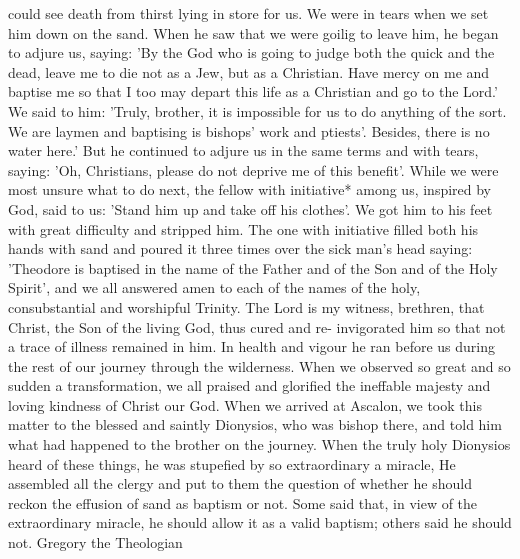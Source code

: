 could see death from thirst lying in store for us. We were in tears
when we set him down on the sand. When he saw that we were
goilig to leave him, he began to adjure us, saying: 'By the God who
is going to judge both the quick and the dead, leave me to die not
as a Jew, but as a Christian. Have mercy on me and baptise me so
that I too may depart this life as a Christian and go to the Lord.'
We said to him: 'Truly, brother, it is impossible for us to do
anything of the sort. We are laymen and baptising is bishops' work
and ptiests'. Besides, there is no water here.' But he continued to
adjure us in the same terms and with tears, saying: 'Oh, Christians,
please do not deprive me of this benefit'. While we were most
unsure what to do next, the fellow with initiative* among us,
inspired by God, said to us: 'Stand him up and take off his clothes'.
We got him to his feet with great difficulty and stripped him. The
one with initiative filled both his hands with sand and poured it
three times over the sick man's head saying: 'Theodore is baptised
in the name of the Father and of the Son and of the Holy Spirit',
and we all answered amen to each of the names of the holy,
consubstantial and worshipful Trinity. The Lord is my witness,
brethren, that Christ, the Son of the living God, thus cured and re-
invigorated him so that not a trace of illness remained in him. In
health and vigour he ran before us during the rest of our journey
through the wilderness. When we observed so great and so sudden
a transformation, we all praised and glorified the ineffable majesty
and loving kindness of Christ our God. When we arrived at
Ascalon, we took this matter to the blessed and saintly Dionysios,
who was bishop there, and told him what had happened to the
brother on the journey. When the truly holy Dionysios heard of
these things, he was stupefied by so extraordinary a miracle, He
assembled all the clergy and put to them the question of whether he
should reckon the effusion of sand as baptism or not. Some said
that, in view of the extraordinary miracle, he should allow it as a
valid baptism; others said he should not. Gregory the Theologian

